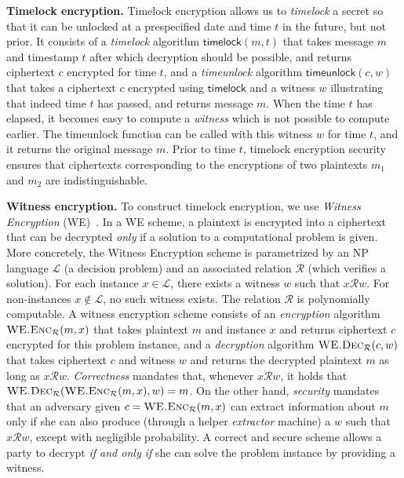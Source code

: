 \noindent
\textbf{Timelock encryption.}
Timelock encryption allows us to \emph{timelock} a secret so that it can be
unlocked at a prespecified date and time $t$ in the future, but not prior.
It consists of a \emph{timelock}
algorithm $\textsf{timelock}(m, t)$ that takes message $m$ and
timestamp $t$ after which decryption should be possible, and returns ciphertext $c$
encrypted for time $t$, and
 a \emph{timeunlock} algorithm $\textsf{timeunlock}(c, w)$ that takes a
ciphertext $c$ encrypted using $\textsf{timelock}$ and a witness $w$
illustrating that indeed time $t$ has passed, and returns message $m$.
When the time $t$ has elapsed, it becomes easy to compute a \emph{witness} which is
not possible to compute earlier. The
\textsf{timeunlock} function can be called with this witness $w$ for time $t$, and it
returns the original message $m$.
Prior to time $t$, timelock encryption security ensures that
ciphertexts corresponding to the encryptions of two plaintexts $m_1$
and $m_2$ are indistinguishable.

\noindent
\textbf{Witness encryption.}
To construct timelock encryption, we
use \emph{Witness Encryption} (WE)~\cite{timelock-bitcoin}.
In a WE scheme, a plaintext is encrypted into a ciphertext that
can be decrypted \emph{only} if a solution to a computational problem is given.
More concretely, the Witness Encryption scheme is parametrized by
an \textsc{NP} language $\mathcal{L}$ (a decision problem)
and an associated relation $\mathcal{R}$ (which verifies a solution).
For each instance
$x \in \mathcal{L}$, there exists a witness $w$ such that $x\mathcal{R}w$. For
non-instances $x \not\in \mathcal{L}$, no such witness exists. The relation $\mathcal{R}$
is polynomially computable.
A witness encryption scheme consists of an \emph{encryption} algorithm $\textsc{WE.Enc}_\mathcal{R}(m, x)$ that takes plaintext
$m$ and instance $x$ and returns ciphertext $c$ encrypted for this problem instance,
and a \emph{decryption} algorithm $\textsc{WE.Dec}_\mathcal{R}(c, w)$ that takes ciphertext
$c$ and witness $w$ and returns the decrypted plaintext $m$ as long as $x \mathcal{R} w$.
\emph{Correctness} mandates that, whenever $x \mathcal{R} w$, it holds
that $\textsc{WE.Dec}_\mathcal{R}(\textsc{WE.Enc}_\mathcal{R}(m, x), w) = m$.
On the other hand, \emph{security}
mandates that an adversary
given $c = \textsc{WE.Enc}_\mathcal{R}(m, x)$
can extract information about $m$
only if she can also produce
(through a helper \emph{extractor} machine)
a $w$ such that $x \mathcal{R} w$, except with negligible probability.
A correct and secure scheme allows a party to decrypt
\emph{if and only if} she can solve the problem instance by providing a
witness.

